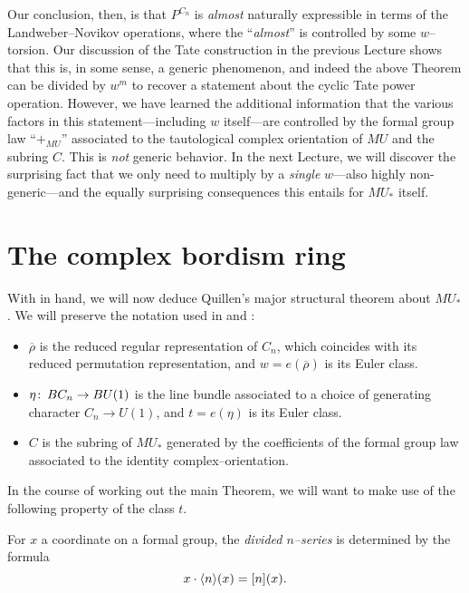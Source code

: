 Our conclusion, then, is that \(P^{C_n}\) is \emph{almost} naturally expressible in terms of the Landweber--Novikov operations, where the ``\emph{almost}'' is controlled by some \(w\)--torsion.  Our discussion of the Tate construction in the previous Lecture shows that this is, in some sense, a generic phenomenon, and indeed the above Theorem can be divided by \(w^m\) to recover a statement about the cyclic Tate power operation.  However, we have learned the additional information that the various factors in this statement---including \(w\) itself---are controlled by the formal group law ``\(+_{MU}\)'' associated to the tautological complex orientation of \(MU\) and the subring \(C\).  This is \emph{not} generic behavior.  In the next Lecture, we will discover the surprising fact that we only need to multiply by a \emph{single} \(w\)---also highly non-generic---and the equally surprising consequences this entails for \(MU_*\) itself.











\section{The complex bordism ring}\label{CalculationOfMUStarSection}

With  in hand, we will now deduce Quillen's major structural theorem about \(MU_*\).  We will preserve the notation used in  and :
\begin{itemize}
\item \(\overline \rho\) is the reduced regular representation of \(C_n\), which coincides with its reduced permutation representation, and \(w = e(\overline \rho)\) is its Euler class.
\item \(\eta\colon\thinspace BC_n \to BU(1)\) is the line bundle associated to a choice of generating character \(C_n \to U(1)\), and \(t = e(\eta)\) is its Euler class.
\item \(C\) is the subring of \(MU_*\) generated by the coefficients of the formal group law associated to the identity complex--orientation.
\end{itemize}
In the course of working out the main Theorem, we will want to make use of the following property of the class \(t\).

\begin{definition}
For \(x\) a coordinate on a formal group, the \textit{divided \(n\)--series} is determined by the formula \[x \cdot \langle n\rangle(x) = [n](x).\]
\end{definition}

